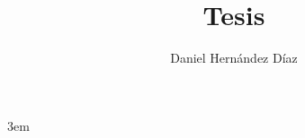 \documentclass[letterpaper, 11pt]{book}
\title{Tesis}
\author{Daniel Hernández Díaz}
\date{}
\theoremstyle{definition}
\theoremstyle{remark}
\begin{document}
\emergencystretch 3em
\frontmatter

\end{document}
